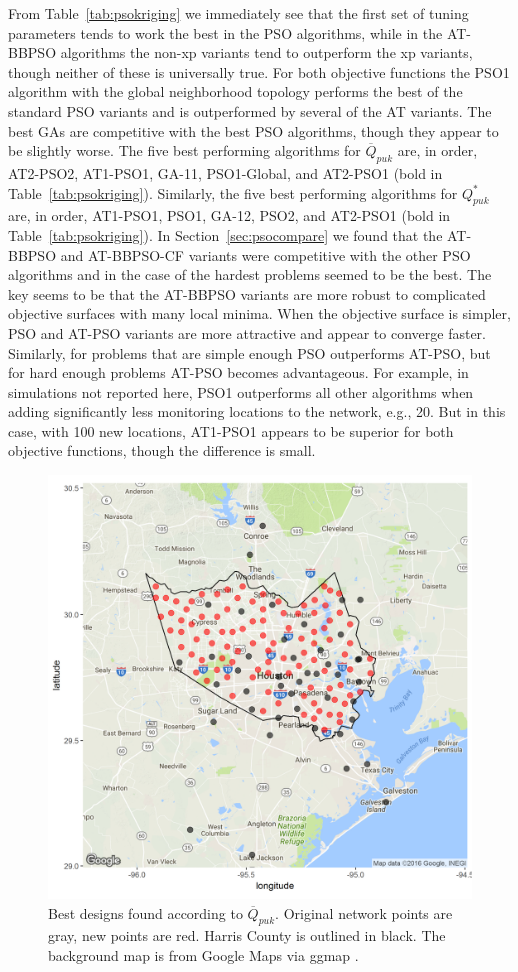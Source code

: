 \documentclass[cmbright]{staauth}
\begin{document}
From Table~\ref{tab:psokriging} we immediately see that the first set of tuning parameters tends to work the best in the PSO algorithms, while in the AT-BBPSO algorithms the non-xp variants tend to outperform the xp variants, though neither of these is universally true. For both objective functions the PSO1 algorithm with the global neighborhood topology performs the best of the standard PSO variants and is outperformed by several of the AT variants. The best GAs are competitive with the best PSO algorithms, though they appear to be slightly worse. The five best performing algorithms for $\overline{Q}_{puk}$ are, in order, AT2-PSO2, AT1-PSO1, GA-11, PSO1-Global, and AT2-PSO1 (bold in Table~\ref{tab:psokriging}). Similarly, the five best performing algorithms for $Q^*_{puk}$ are, in order, AT1-PSO1, PSO1, GA-12, PSO2, and AT2-PSO1 (bold in Table~\ref{tab:psokriging}). In Section~\ref{sec:psocompare} we found that the AT-BBPSO and AT-BBPSO-CF variants were competitive with the other PSO algorithms and in the case of the hardest problems seemed to be the best. The key seems to be that the AT-BBPSO variants are more robust to complicated objective surfaces with many local minima. When the objective surface is simpler, PSO and AT-PSO variants are more attractive and appear to converge faster. Similarly, for problems that are simple enough PSO outperforms AT-PSO, but for hard enough problems AT-PSO becomes advantageous. For example, in simulations not reported here, PSO1 outperforms all other algorithms when adding significantly less monitoring locations to the network, e.g., 20. But in this case, with 100 new locations, AT1-PSO1 appears to be superior for both objective functions, though the difference is small.

\begin{figure}[p]
\centering
\includegraphics[width=.8\textwidth]{sig2pukmean.png}
\caption{Best designs found according to $\overline{Q}_{puk}$. Original network points are gray, new points are red. Harris County is outlined in black. The background map is from Google Maps via ggmap \citep{ggmap2013}.}
\label{fig:designoutmean}
\end{figure}
\end{document}

